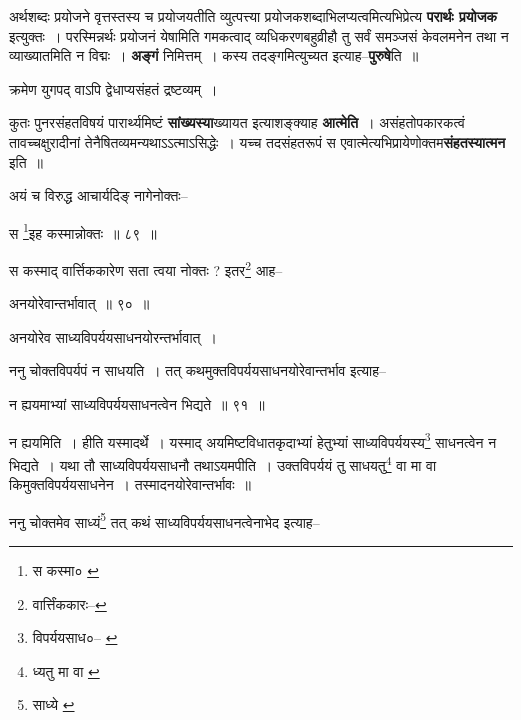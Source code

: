 \documentclass[article,12pt,a4paper]{memoir}
\begin{document}
	  \pstart अर्थशब्दः प्रयोजने वृत्तस्तस्य च प्रयोजयतीति व्युत्पत्त्या प्रयोजकशब्दाभिलप्यत्वमित्यभिप्रेत्य \textbf{परार्थः प्रयोजक} इत्युक्तः । परस्मिन्नर्थः प्रयोजनं येषामिति गमकत्वाद् व्यधिकरणबहुव्रीहौ तु सर्वं समञ्जसं केवलमनेन तथा न व्याख्यातमिति न विद्मः । \textbf{अङ्गं} निमित्तम् । कस्य तदङ्गमित्युच्यत इत्याह--\textbf{पुरुषे}ति ॥
	\pend
      

	  \pstart क्रमेण युगपद् वाऽपि द्वेधाप्यसंहतं द्रष्टव्यम् ।
	\pend
      

	  \pstart कुतः पुनरसंहतविषयं पारार्थ्यमिष्टं \textbf{सांख्यस्या}ख्यायत इत्याशङ्क्याह \textbf{आत्मेति} । असंहतोपकारकत्वं तावच्चक्षुरादीनां तेनैषितव्यमन्यथाऽऽत्माऽसिद्धेः । यच्च तदसंहतरूपं स एवात्मेत्यभिप्रायेणोक्तम\textbf{संहतस्यात्मन} इति ॥
	\pend
	  \bigskip
	  \begingroup
	

	  \pstart अयं च विरुद्ध आचार्यदिङ् नागेनोक्तः--
	\pend
       
	  \bigskip
	  \begingroup
	

	  \pstart स \footnote{स कस्मा० \cite{dp-msC}}\-इह कस्मान्नोक्तः ॥ ८९ ॥
	\pend
      
	  \endgroup
	 

	  \pstart स कस्माद् वार्त्तिककारेण सता त्वया नोक्तः ? इतर\footnote{वार्त्तिंककारः--\cite{dp-msD-n}} आह--
	\pend
       
	  \bigskip
	  \begingroup
	

	  \pstart अनयोरेवान्तर्भावात् ॥ ९० ॥
	\pend
      
	  \endgroup
	 

	  \pstart अनयोरेव साध्यविपर्ययसाधनयोरन्तर्भावात् ।
	\pend
       

	  \pstart ननु चोक्तविपर्यपं न साधयति । तत् कथमुक्तविपर्ययसाधनयोरेवान्तर्भाव इत्याह--
	\pend
       
	  \bigskip
	  \begingroup
	

	  \pstart न ह्ययमाभ्यां साध्यविपर्ययसाधनत्वेन भिद्यते ॥ ९१ ॥
	\pend
      
	  \endgroup
	 

	  \pstart न ह्ययमिति । हीति यस्मादर्थे । यस्माद् अयमिष्टविधातकृदाभ्यां हेतुभ्यां साध्यविपर्ययस्य\footnote{विपर्ययसाध०--\cite{dp-msA} \cite{dp-msB} \cite{dp-edP} \cite{dp-edH} \cite{dp-edE} \cite{dp-edN}} साधनत्वेन न भिद्यते । यथा तौ साध्यविपर्ययसाधनौ तथाऽयमपीति । उक्तविपर्ययं तु साधयतु\footnote{ध्यतु मा वा \cite{dp-edE} \cite{dp-msD}} वा मा वा किमुक्तविपर्ययसाधनेन । तस्मादनयोरेवान्तर्भावः ॥
	\pend
       

	  \pstart ननु चोक्तमेव साध्यं\footnote{साध्ये \cite{dp-msA} \cite{dp-msB} \cite{dp-edP} \cite{dp-edH} \cite{dp-edN}} तत् कथं साध्यविपर्ययसाधनत्वेनाभेद इत्याह--
	\pend
       
\end{document}
